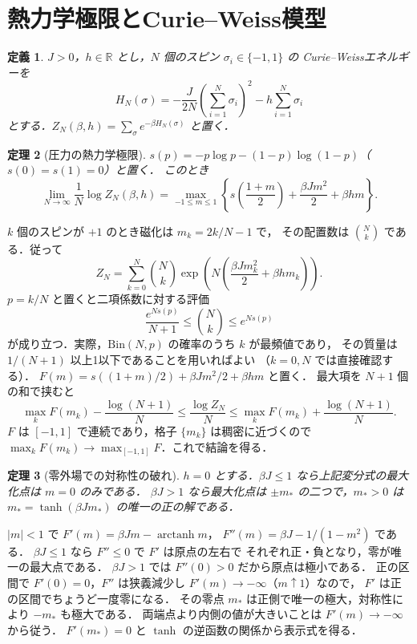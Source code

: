 \documentclass[a5paper,10pt,onecolumn]{jsarticle}
\makeatletter
\theoremstyle{mathnotetheorem}
\newtheorem{theorem}{定理}[section]
\newtheorem{definition}[theorem]{定義}
\renewcommand{\proofname}{証明}
\renewenvironment{proof}[1][\proofname]{%
  \par\pushQED{\qed}\normalfont\topsep4\p@\@plus2\p@\relax
  \trivlist\item[\hskip\labelsep\bfseries #1]\ignorespaces
}{\popQED\endtrivlist\@endpefalse}
\makeatother
\begin{document}
\section{熱力学極限とCurie--Weiss模型}
\begin{definition}
$J>0$，$h\in\mathbb R$ とし，$N$ 個のスピン $\sigma_i\in\{-1,1\}$ の
Curie--Weissエネルギーを
\[
 H_N(\sigma)=-\frac{J}{2N}\left(\sum_{i=1}^N\sigma_i\right)^2
 -h\sum_{i=1}^N\sigma_i
\]
とする．$Z_N(\beta,h)=\sum_\sigma e^{-\beta H_N(\sigma)}$ と置く．
\end{definition}
\begin{theorem}[圧力の熱力学極限]
$s(p)=-p\log p-(1-p)\log(1-p)$（$s(0)=s(1)=0$）と置く．
このとき
\[
 \lim_{N\to\infty}\frac1N\log Z_N(\beta,h)
 =\max_{-1\le m\le1}\left\{
 s\!\left(\frac{1+m}2\right)+\frac{\beta Jm^2}2+\beta hm
 \right\}.
\]
\end{theorem}
\begin{proof}
$k$ 個のスピンが $+1$ のとき磁化は $m_k=2k/N-1$ で，
その配置数は $\binom Nk$ である．従って
\[
 Z_N=\sum_{k=0}^N\binom Nk
 \exp\!\left(N\left(\frac{\beta Jm_k^2}2+\beta hm_k\right)\right).
\]
$p=k/N$ と置くと二項係数に対する評価
\[
 \frac{e^{Ns(p)}}{N+1}\le\binom Nk\le e^{Ns(p)}
\]
が成り立つ．実際，$\mathrm{Bin}(N,p)$ の確率のうち $k$ が最頻値であり，
その質量は $1/(N+1)$ 以上1以下であることを用いればよい
（$k=0,N$ では直接確認する）．
$F(m)=s((1+m)/2)+\beta Jm^2/2+\beta hm$ と置く．
最大項を $N+1$ 個の和で挟むと
\[
 \max_kF(m_k)-\frac{\log(N+1)}N
 \le\frac{\log Z_N}N
 \le\max_kF(m_k)+\frac{\log(N+1)}N.
\]
$F$ は $[-1,1]$ で連続であり，格子 $\{m_k\}$ は稠密に近づくので
$\max_kF(m_k)\to\max_{[-1,1]}F$．これで結論を得る．
\end{proof}
\begin{theorem}[零外場での対称性の破れ]
$h=0$ とする．$\beta J\le1$ なら上記変分式の最大化点は $m=0$ のみである．
$\beta J>1$ なら最大化点は $\pm m_*$ の二つで，$m_*>0$ は
$m_*=\tanh(\beta Jm_*)$ の唯一の正の解である．
\end{theorem}
\begin{proof}
$|m|<1$ で $F'(m)=\beta Jm-\operatorname{arctanh}m$，
$F''(m)=\beta J-1/(1-m^2)$ である．
$\beta J\le1$ なら $F''\le0$ で $F'$ は原点の左右で
それぞれ正・負となり，零が唯一の最大点である．
$\beta J>1$ では $F''(0)>0$ だから原点は極小である．
正の区間で $F'(0)=0$，$F''$ は狭義減少し
$F'(m)\to-\infty$（$m\uparrow1$）なので，
$F'$ は正の区間でちょうど一度零になる．
その零点 $m_*$ は正側で唯一の極大，対称性により $-m_*$ も極大である．
両端点より内側の値が大きいことは $F'(m)\to-\infty$ から従う．
$F'(m_*)=0$ と $\tanh$ の逆函数の関係から表示式を得る．
\end{proof}
\end{document}
